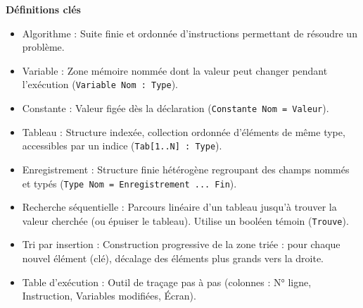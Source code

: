 \documentclass[11pt]{article}
\newcommand{\cle}[1]{{\popxbold\color{popdark}#1}}
\begin{document}
\begin{bilan}
\textbf{Définitions clés}
\begin{itemize}
    \item \cle{Algorithme} : Suite finie et ordonnée d'instructions permettant de résoudre un problème.
    \item \cle{Variable} : Zone mémoire nommée dont la valeur peut changer pendant l'exécution (\texttt{Variable Nom : Type}).
    \item \cle{Constante} : Valeur figée dès la déclaration (\texttt{Constante Nom = Valeur}).
    \item \cle{Tableau} : Structure indexée, collection ordonnée d'éléments de même type, accessibles par un indice (\texttt{Tab[1..N] : Type}).
    \item \cle{Enregistrement} : Structure finie hétérogène regroupant des champs nommés et typés (\texttt{Type Nom = Enregistrement ... Fin}).
    \item \cle{Recherche séquentielle} : Parcours linéaire d'un tableau jusqu'à trouver la valeur cherchée (ou épuiser le tableau). Utilise un \cle{booléen témoin} (\texttt{Trouve}).
    \item \cle{Tri par insertion} : Construction progressive de la zone triée : pour chaque nouvel élément (clé), décalage des éléments plus grands vers la droite.
    \item \cle{Table d'exécution} : Outil de traçage pas à pas (colonnes : N° ligne, Instruction, Variables modifiées, Écran).
\end{itemize}


\end{bilan}
\end{document}
